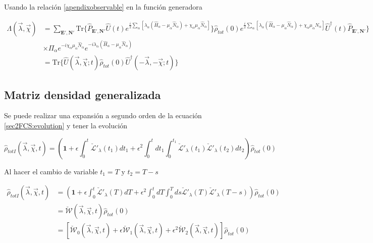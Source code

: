 \begin{appendixs}
Usando la relación \ref{apendixobservable} en la función generadora

\begin{align*}
    \Lambda(\vec{\lambda},\vec{\chi}) & = \sum_{\textbf{E}',\textbf{N}'}\text{Tr}\{ \hat{P}_{\textbf{E}',\textbf{N}'} \hat{U}(t) e^{\frac{i}{2}\sum_{\alpha}[\lambda_{\alpha}(\hat{H}_{\alpha} - \mu_{\alpha}\hat{N}_{\alpha}) + \chi_{\alpha}\mu_{\alpha}\hat{N}_{\alpha}  ]}  \}\hat{\rho}_{tot}(0) e^{\frac{i}{2}\sum_{\alpha}[\lambda_{\alpha}(\hat{H}_{\alpha} - \mu_{\alpha}\hat{N}_{\alpha}) + \chi_{\alpha}\mu_{\alpha}\hat{N}_{\alpha} ] }\hat{U}^{\dagger}(t) \hat{P}_{\textbf{E}',\textbf{N}'} \} \\
    & \times \Pi_{\alpha}e^{-i\chi_{\alpha}\mu_{\alpha}\hat{N}_{\alpha}}e^{-i\lambda_{\alpha}(\hat{H}_{\alpha} -\mu_{\alpha}\hat{N}_{\alpha})} \\
    & = \text{Tr}\{ \hat{U}(\vec{\lambda},\vec{\chi};t)\hat{\rho}_{tot}(0)\hat{U}^{\dagger}(-\vec{\lambda},-\vec{\chi};t)  \}
\end{align*}

\newpage 

    \subsection{Matriz densidad generalizada}
    Se puede realizar una expansión a segundo orden de la ecuación \ref{sec2FCS:evolution} y tener la evolución

    \begin{equation*}
        \hat{\rho}_{totI}(\vec{\lambda},\vec{\chi},t) = \left( \textbf{1} + \epsilon \int_{0}^{t}\check{\mathcal{L}}'_{\lambda}(t_{1})dt_{1} + \epsilon^{2}\int_{0}^{t}dt_{1}\int_{0}^{t_{1}}\check{\mathcal{L}}'_{\lambda}(t_{1})\check{\mathcal{L}}'_{\lambda}(t_{2})dt_{2} \right) \hat{\rho}_{tot}(0)
    \end{equation*}

Al hacer el cambio de variable $t_{1}=T$ y $t_{2}=T-s$ 

\begin{align*}
    \hat{\rho}_{totI}(\vec{\lambda},\vec{\chi},t) & = \left( \textbf{1} + \epsilon \int_{0}^{t}\check{\mathcal{L}}'_{\lambda}(T)dT + \epsilon^{2}\int_{0}^{t}dT\int_{0}^{T}ds \check{\mathcal{L}}'_{\lambda}(T)\check{\mathcal{L}}'_{\lambda}(T-s) \right)\hat{\rho}_{tot}(0) \\
    & = \check{\mathcal{W}}(\vec{\lambda},\vec{\chi},t)\hat{\rho}_{tot}(0) \\
    & =  [\check{\mathcal{W}}_{0}(\vec{\lambda},\vec{\chi},t) + \epsilon \check{\mathcal{W}}_{1}(\vec{\lambda},\vec{\chi},t) + \epsilon^{2}\check{\mathcal{W}}_{2}(\vec{\lambda},\vec{\chi},t)] \hat{\rho}_{tot}(0)
\end{align*}


\end{appendixs}
